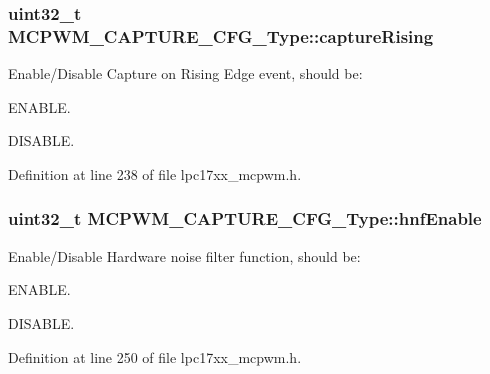 \hypertarget{struct_m_c_p_w_m___c_a_p_t_u_r_e___c_f_g___type_aed69de8d9e4d14df5b8243621a246ced}{
\subsubsection[{capture\-Rising}]{\setlength{\rightskip}{0pt plus 5cm}uint32\-\_\-t {\bf \-M\-C\-P\-W\-M\-\_\-\-C\-A\-P\-T\-U\-R\-E\-\_\-\-C\-F\-G\-\_\-\-Type\-::capture\-Rising}}}\label{struct_m_c_p_w_m___c_a_p_t_u_r_e___c_f_g___type_aed69de8d9e4d14df5b8243621a246ced}
\-Enable/\-Disable \-Capture on \-Rising \-Edge event, should be\-:
\begin{DoxyItemize}
\item \-E\-N\-A\-B\-L\-E.
\item \-D\-I\-S\-A\-B\-L\-E. 
\end{DoxyItemize}

\-Definition at line 238 of file lpc17xx\-\_\-mcpwm.\-h.

\hypertarget{struct_m_c_p_w_m___c_a_p_t_u_r_e___c_f_g___type_a14a51979fea6c3f4faed9a12acd9b010}{
\subsubsection[{hnf\-Enable}]{\setlength{\rightskip}{0pt plus 5cm}uint32\-\_\-t {\bf \-M\-C\-P\-W\-M\-\_\-\-C\-A\-P\-T\-U\-R\-E\-\_\-\-C\-F\-G\-\_\-\-Type\-::hnf\-Enable}}}\label{struct_m_c_p_w_m___c_a_p_t_u_r_e___c_f_g___type_a14a51979fea6c3f4faed9a12acd9b010}
\-Enable/\-Disable \-Hardware noise filter function, should be\-:
\begin{DoxyItemize}
\item \-E\-N\-A\-B\-L\-E.
\item \-D\-I\-S\-A\-B\-L\-E. 
\end{DoxyItemize}

\-Definition at line 250 of file lpc17xx\-\_\-mcpwm.\-h.


